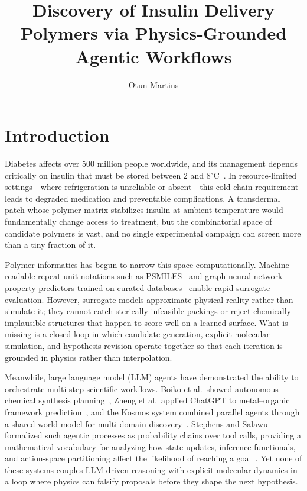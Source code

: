 \documentclass[twocolumn]{fairmeta}
\title{Discovery of Insulin Delivery Polymers via Physics-Grounded Agentic Workflows}
\author[1]{Otun Martins}
\affiliation[1]{AI-Driven Material Discovery Laboratory}
\begin{document}
\maketitle

\section{Introduction}

Diabetes affects over 500 million people worldwide, and its management depends critically on insulin that must be stored between 2 and 8$^{\circ}$C~\cite{hsu2022glycosylated}.
In resource-limited settings---where refrigeration is unreliable or absent---this cold-chain requirement leads to degraded medication and preventable complications.
A transdermal patch whose polymer matrix stabilizes insulin at ambient temperature would fundamentally change access to treatment, but the combinatorial space of candidate polymers is vast, and no single experimental campaign can screen more than a tiny fraction of it.

Polymer informatics has begun to narrow this space computationally.
Machine-readable repeat-unit notations such as PSMILES~\cite{lin2019bigsmiles,kuenneth2023polybert} and graph-neural-network property predictors trained on curated databases~\cite{huan2020polymer,kern2022solvent,gurnani2024ai} enable rapid surrogate evaluation.
However, surrogate models approximate physical reality rather than simulate it; they cannot catch sterically infeasible packings or reject chemically implausible structures that happen to score well on a learned surface.
What is missing is a closed loop in which candidate generation, explicit molecular simulation, and hypothesis revision operate together so that each iteration is grounded in physics rather than interpolation.

Meanwhile, large language model (LLM) agents have demonstrated the ability to orchestrate multi-step scientific workflows.
Boiko et al.\ showed autonomous chemical synthesis planning~\cite{boiko2023autonomous}, Zheng et al.\ applied ChatGPT to metal--organic framework prediction~\cite{zheng2023chatgpt}, and the Kosmos system combined parallel agents through a shared world model for multi-domain discovery~\cite{kosmos2025}.
Stephens and Salawu formalized such agentic processes as probability chains over tool calls, providing a mathematical vocabulary for analyzing how state updates, inference functionals, and action-space partitioning affect the likelihood of reaching a goal~\cite{stephens2025mathframing}.
Yet none of these systems couples LLM-driven reasoning with explicit molecular dynamics in a loop where physics can falsify proposals before they shape the next hypothesis.
\end{document}
